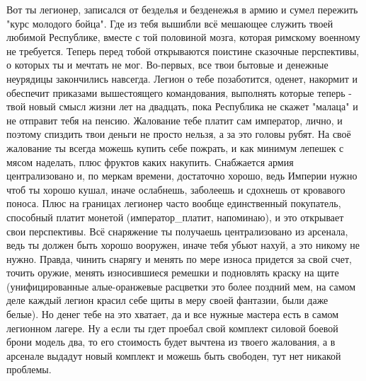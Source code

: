 Вот ты легионер, записался от безделья и безденежья в армию и сумел пережить "курс молодого бойца". Где из тебя вышибли всё мешающее служить твоей любимой Республике, вместе с той половиной мозга, которая римскому военному не требуется. Теперь перед тобой открываются поистине сказочные перспективы, о которых ты и мечтать не мог. Во-первых, все твои бытовые и денежные неурядицы закончились навсегда. Легион о тебе позаботится, оденет, накормит и обеспечит приказами вышестоящего командования, выполнять которые теперь - твой новый смысл жизни лет на двадцать, пока Республика не скажет "малаца" и не отправит тебя на пенсию. Жалование тебе платит сам император, лично, и поэтому спиздить твои деньги не просто нельзя, а за это головы рубят. На своё жалование ты всегда можешь купить себе пожрать, и как минимум лепешек с мясом наделать, плюс фруктов каких накупить. Снабжается армия централизовано и, по меркам времени, достаточно хорошо, ведь Империи нужно чтоб ты хорошо кушал, иначе ослабнешь, заболеешь и сдохнешь от кровавого поноса. 
Плюс на границах легионер часто вообще единственный покупатель, способный платит монетой (император\_платит, напоминаю), и это открывает свои перспективы. Всё снаряжение ты получаешь централизовано из арсенала, ведь ты должен быть хорошо вооружен, иначе тебя убьют нахуй, а это никому не нужно. 
Правда, чинить снарягу и менять по мере износа придется за свой счет, точить оружие, менять износившиеся ремешки и подновлять краску на щите (унифицированные алые-оранжевые расцветки это более поздний мем, на самом деле каждый легион красил себе щиты в меру своей фантазии, были даже белые). Но денег тебе на это хватает, да и все нужные мастера есть в самом легионном лагере. Ну а если ты гдет проебал свой комплект силовой боевой брони модель два, то его стоимость будет вычтена из твоего жалования, а в арсенале выдадут новый комплект и можешь быть свободен, тут нет никакой проблемы.


